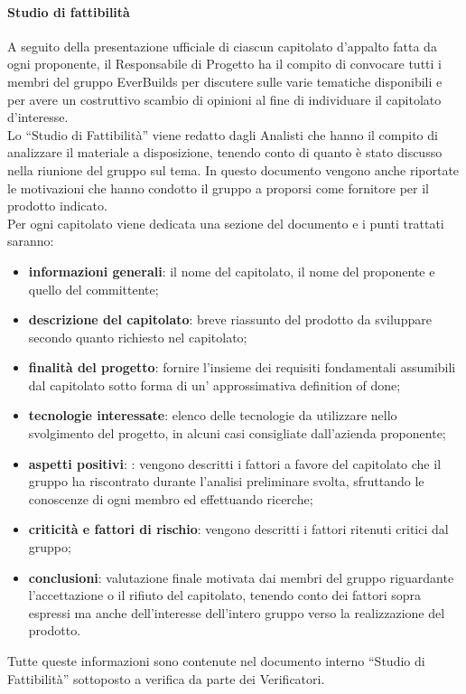 			\paragraph{Studio di fattibilità}
				A seguito della presentazione ufficiale di ciascun capitolato d’appalto fatta da ogni proponente, il Responsabile di Progetto ha il compito di convocare tutti i membri del gruppo EverBuilds per discutere sulle varie tematiche disponibili e per avere un costruttivo scambio di opinioni al fine di individuare il capitolato d’interesse. \\
				Lo “Studio di Fattibilità” viene redatto dagli Analisti che hanno il compito di analizzare il materiale a disposizione, tenendo conto di quanto è stato discusso nella riunione del gruppo sul tema. In questo documento vengono anche riportate le motivazioni che hanno condotto il gruppo a proporsi come fornitore per il prodotto indicato.\\
				Per ogni capitolato viene dedicata una sezione del documento e i punti trattati saranno:\\
				\begin{itemize}
					\item\textbf{informazioni generali}: il nome del capitolato, il nome del proponente e quello del committente; 
					\item\textbf{descrizione del capitolato}: breve riassunto del prodotto da sviluppare secondo quanto richiesto nel capitolato; 
					\item\textbf{finalità del progetto}: fornire l’insieme dei requisiti fondamentali assumibili dal capitolato sotto forma di un’ approssimativa definition of done; 
					\item\textbf{tecnologie interessate}: elenco delle tecnologie da utilizzare nello svolgimento del progetto, in alcuni casi consigliate dall’azienda proponente; 
					\item\textbf{aspetti positivi}: : vengono descritti i fattori a favore del capitolato che il gruppo ha riscontrato durante l’analisi preliminare svolta, sfruttando le conoscenze di ogni membro ed effettuando ricerche;
					\item\textbf{criticità e fattori di rischio}: vengono descritti i fattori ritenuti critici dal gruppo; 
					\item\textbf{conclusioni}: valutazione finale motivata dai membri del gruppo riguardante l’accettazione o il rifiuto del capitolato, tenendo conto dei fattori sopra espressi ma anche dell’interesse dell’intero gruppo verso la realizzazione del prodotto.
				\end{itemize}
				Tutte queste informazioni sono contenute nel documento interno “Studio di Fattibilità” sottoposto a verifica da parte dei Verificatori.\\
